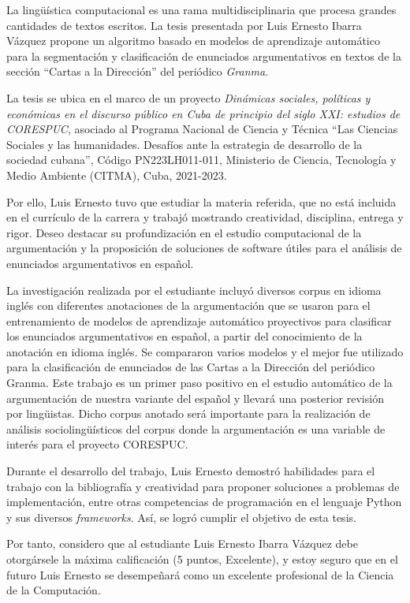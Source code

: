 \begin{opinion}
La lingüística computacional es una rama multidisciplinaria que procesa grandes 
cantidades de textos escritos. La tesis presentada por Luis Ernesto Ibarra Vázquez 
propone un algoritmo basado en modelos de aprendizaje automático para la segmentación 
y clasificación de enunciados argumentativos en textos de la sección “Cartas a la Dirección” 
del periódico \emph{Granma}.

La tesis se ubica en el marco de un proyecto \emph{Dinámicas sociales, políticas y económicas en el 
discurso público en Cuba de principio del siglo XXI: estudios de CORESPUC}, asociado al Programa 
Nacional de Ciencia y Técnica “Las Ciencias Sociales y las humanidades. Desafíos ante la estrategia 
de desarrollo de la sociedad cubana”, Código PN223LH011-011, Ministerio de Ciencia, Tecnología y 
Medio Ambiente (CITMA), Cuba, 2021-2023.

Por ello, Luis Ernesto tuvo que estudiar la materia referida, que no está incluida en el currículo 
de la carrera y trabajó mostrando creatividad, disciplina, entrega y rigor. Deseo destacar su 
profundización en el estudio computacional de la argumentación y la proposición de soluciones de 
software útiles para el análisis de enunciados argumentativos en español.

La investigación realizada por el estudiante incluyó diversos corpus en idioma inglés con 
diferentes anotaciones de la argumentación que se usaron para el entrenamiento de modelos de 
aprendizaje automático proyectivos para clasificar los enunciados argumentativos en español, a 
partir del conocimiento de la anotación en idioma inglés. Se compararon varios modelos y el mejor 
fue utilizado para la clasificación de enunciados de las Cartas a la Dirección del periódico Granma. 
Este trabajo es un primer paso positivo en el estudio automático de la argumentación de nuestra variante 
del español y llevará una posterior revisión por lingüistas. Dicho corpus anotado será importante para la 
realización de análisis sociolingüísticos del corpus donde la argumentación es una variable de interés para 
el proyecto CORESPUC.

Durante el desarrollo del trabajo, Luis Ernesto demostró habilidades para el trabajo con la bibliografía y 
creatividad para proponer soluciones a problemas de implementación, entre otras competencias de programación 
en el lenguaje Python y sus diversos \emph{frameworks}. Así, se logró cumplir el objetivo de esta tesis.

Por tanto, considero que al estudiante Luis Ernesto Ibarra Vázquez debe otorgársele la máxima calificación 
(5 puntos, Excelente), y estoy seguro que en el futuro Luis Ernesto se desempeñará como un excelente profesional 
de la Ciencia de la Computación.


\end{opinion}
